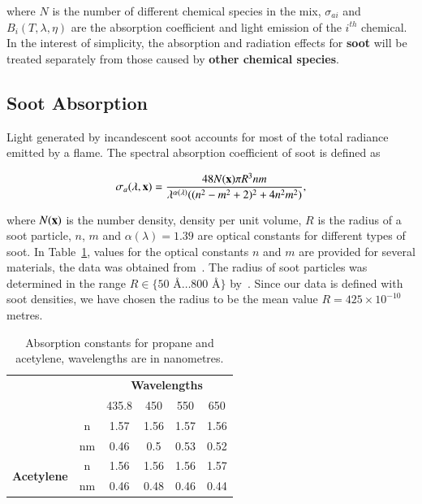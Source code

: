 where $N$ is the number of different chemical species in the mix, $\sigma_{ai}$ and $B_i(T, \lambda, \eta)$ are the absorption coefficient and light emission of the $i^{th}$ chemical.
In the interest of simplicity, the absorption and radiation effects for \textbf{soot} will be treated separately from those caused by \textbf{other chemical species}.

\subsection{Soot Absorption}
\label{sec:soot_absorption}

Light generated by incandescent soot accounts for most of the total radiance emitted by a flame. 
The spectral absorption coefficient of soot is defined as

\begin{equation}
\sigma_a(\lambda, \mathbf{x}) = \frac{48 N(\mathbf{x}) \pi R^3 n m}{\lambda^{\alpha(\lambda)} ((n^2 - m^2 +2)^2 + 4 n^2 m^2)},
\end{equation}

where $N(\mathbf{x})$ is the number density, density per unit volume, $R$ is the radius of a soot particle, $n$, $m$ and $\alpha(\lambda) = 1.39$ are optical constants for different types of soot.
In Table~\ref{tb:soot_absorption_coefficients}, values for the optical constants $n$ and $m$ are provided for several materials, the data was obtained from~\cite{Dalzell:1969}.
The radius of soot particles was determined in the range $R \in \lbrace 50\mbox{~\AA} \ldots 800\mbox{~\AA} \rbrace $ by~\cite{Dalzell:1969}.
Since our data is defined with soot densities, we have chosen the radius to be the mean value $R = 425 \times 10^{-10}$ metres.

\begin{table}[htbp!]
\centering
\caption{Absorption constants for propane and acetylene, wavelengths are in nanometres.}
\label{tb:soot_absorption_coefficients}
\begin{tabular}{cc|c|c|c|c|}
\cline{3-6}
                                                 &    & \multicolumn{4}{c|}{\textbf{Wavelengths}} \\ \cline{3-6} 
                                                 &    & 435.8   & 450    & 550   & 650   \\ \hhline{--|=|=|=|=|}
\multicolumn{1}{|c|}{\multirow{2}{*}{\textbf{Propane}}}   & \multicolumn{1}{c||}{n}  & 1.57    & 1.56   & 1.57  & 1.56  \\ \cline{2-6} 
\multicolumn{1}{|c|}{}                           & \multicolumn{1}{c||}{nm} & 0.46    & 0.5    & 0.53  & 0.52  \\ \hline
\multicolumn{1}{|c|}{\multirow{2}{*}{\textbf{Acetylene}}} & \multicolumn{1}{c||}{n}  & 1.56    & 1.56   & 1.56  & 1.57  \\ \cline{2-6} 
\multicolumn{1}{|c|}{}                           & \multicolumn{1}{c||}{nm} & 0.46    & 0.48   & 0.46  & 0.44  \\ \hline
\end{tabular}
\end{table}

